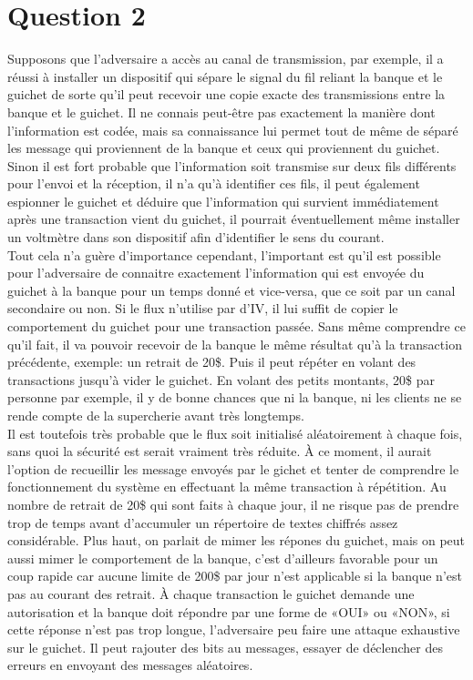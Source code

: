 \documentclass{article}
\begin{document}
\section{Question 2}
Supposons que l'adversaire a accès au canal de transmission, par exemple, il a réussi à installer un dispositif qui sépare le signal du fil reliant la banque et le guichet de sorte qu'il peut recevoir une copie exacte des transmissions entre la banque et le guichet. Il ne connais peut-être pas exactement la manière dont l'information est codée, mais sa connaissance lui permet tout de même de séparé les message qui proviennent de la banque et ceux qui proviennent du guichet. Sinon il est fort probable que l'information soit transmise sur deux fils différents pour l'envoi et la réception, il n'a qu'à identifier ces fils, il peut également espionner le guichet et déduire que l'information qui survient immédiatement après une transaction vient du guichet, il pourrait éventuellement même installer un voltmètre dans son dispositif afin d'identifier le sens du courant.\\
Tout cela n'a guère d'importance cependant, l'important est qu'il est possible pour l'adversaire de connaitre exactement l'information qui est envoyée du guichet à la banque pour un temps donné et vice-versa, que ce soit par un canal secondaire ou non. Si le flux n'utilise par d'IV, il lui suffit de copier le comportement du guichet pour une transaction passée. Sans même comprendre ce qu'il fait, il va pouvoir recevoir de la banque le même résultat qu'à la transaction précédente, exemple: un retrait de 20\$. Puis il peut répéter en volant des transactions jusqu'à vider le guichet. En volant des petits montants, 20\$ par personne par exemple, il y de bonne chances que ni la banque, ni les clients ne se rende compte de la supercherie avant très longtemps.\\
Il est toutefois très probable que le flux soit initialisé aléatoirement à chaque fois, sans quoi la sécurité est serait vraiment très réduite. À ce moment, il aurait l'option de recueillir les message envoyés par le gichet et tenter de comprendre le fonctionnement du système en effectuant la même transaction à répétition. Au nombre de retrait de 20\$ qui sont faits à chaque jour, il ne risque pas de prendre trop de temps avant d'accumuler un répertoire de textes chiffrés assez considérable. Plus haut, on parlait de mimer les répones du guichet, mais on peut aussi mimer le comportement de la banque, c'est d'ailleurs favorable pour un coup rapide car aucune limite de 200\$ par jour n'est applicable si la banque n'est pas au courant des retrait. À chaque transaction le guichet demande une autorisation et la banque doit répondre par une forme de «OUI» ou «NON», si cette réponse n'est pas trop longue, l'adversaire peu faire une attaque exhaustive sur le guichet. Il peut rajouter des bits au messages, essayer de déclencher des erreurs en envoyant des messages aléatoires.
\end{document}
